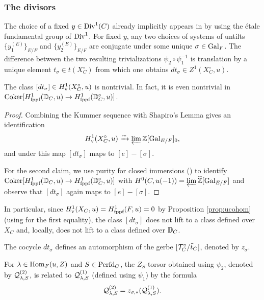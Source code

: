 \subsubsection{The divisors}\label{sec:choiceoflifts}
The choice of a fixed $y \in \mathrm{Div}^{1}(C)$ already implicitly appears in \cite{Geometrization} by using the \'{e}tale fundamental group of $\mathrm{Div}^{1}$. For fixed $y$, any two choices of systems of untilts $\{y_{1}^{(E)}\}_{E/F}$ and $\{y_{2}^{(E)}\}_{E/F}$ are conjugate under some unique $\sigma \in \mathrm{Gal}_{F}$. The difference between the two resulting trivializations $\psi_{2} \circ \psi_{1}^{-1}$ is translation by a unique element $t_{\sigma} \in t(X_{C}^{\circ})$ from which one obtains $dt_{\sigma} \in Z^{1}(X_{C}^{\circ},u)$.

\begin{lem}\label{lem:sigmaaut}
    The class $[dt_{\sigma}] \in H_{\textnormal{v}}^{1}(X_{C}^{\circ},u)$ is nontrivial. In fact, it is even nontrivial in $\textnormal{Coker}[H_{\textnormal{fppf}}^{1}(\mathbb{D}_{C},u) \to H_{\textnormal{fppf}}^{1}(\mathbb{D}_{C}^{\circ},u)]$.
\end{lem}

\begin{proof}
Combining the Kummer sequence with Shapiro's Lemma gives an identification
\begin{equation*}
H_{\textnormal{v}}^{1}(X_{C}^{\circ},u) \xrightarrow{\sim} \varprojlim \mathbb{Z}[\mathrm{Gal}_{E/F}]_{0},
\end{equation*}
and under this map $[dt_{\sigma}]$ maps to $[e] -[\sigma]$.

For the second claim, we use purity for closed immersions (\cite[Theorem 7.1.2]{CS24}) to identify $\textnormal{Coker}[H_{\textnormal{fppf}}^{1}(\mathbb{D}_{C},u) \to H_{\textnormal{fppf}}^{1}(\mathbb{D}_{C}^{\circ},u)]$ with $H^{0}(C, u(-1)) = \varprojlim \widehat{\mathbb{Z}}[\mathrm{Gal}_{E/F}]$ and observe that $[dt_{\sigma}]$ again maps to $[e] - [\sigma]$. 
\end{proof}

In particular, since $H_{\textnormal{v}}^{1}(X_{C},u) = H_{\textnormal{fppf}}^{1}(F,u) = 0$ by Proposition \ref{prop:ucohom} (using \cite[Th\'{e}or\`{e}me 11.4]{Fargues22} for the first equality), the class $[dt_{\sigma}]$ does not lift to a class defined over $X_{C}$ and, locally, does not lift to a class defined over $\mathbb{D}_{C}$.

The cocycle $dt_{\sigma}$ defines an automorphism of the gerbe $[\mathcal{T}_{C}^{\circ}/\tilde{t}_{C}]$, denoted by $z_{\sigma}$. 

\begin{lem}
    For $\lambda \in \mathrm{Hom}_{F}(u,Z)$ and $S \in \mathrm{Perfd}_{C}$, the $Z_{S}$-torsor obtained using $\psi_{2}$, denoted by $\mathcal{Q}^{(2)}_{\lambda,S}$, is related to $\mathcal{Q}^{(1)}_{\lambda,S}$ (defined using $\psi_{1}$) by the formula 
    \begin{equation*}
\mathcal{Q}^{(2)}_{\lambda,S} = z_{\sigma,*}(\mathcal{Q}^{(1)}_{\lambda,S}).
    \end{equation*}
\end{lem}

